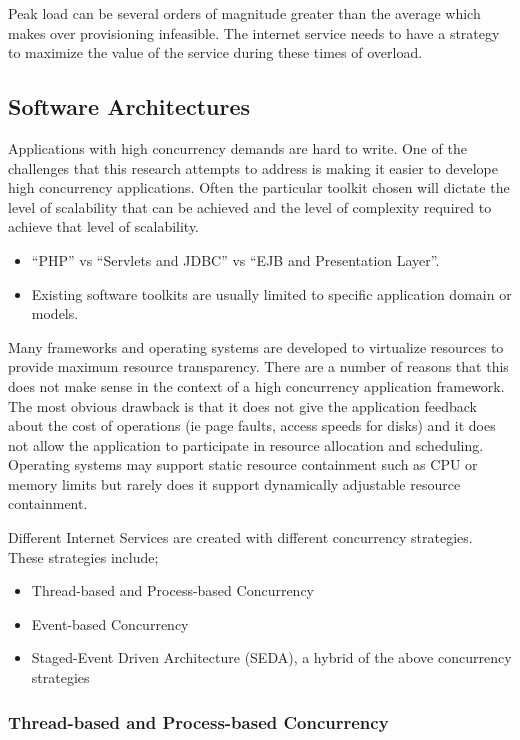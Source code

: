 \documentclass[a4paper]{article}
\begin{document}
Peak load can be several orders of magnitude greater than the average which makes over provisioning infeasible. The internet service needs to have a strategy to maximize the value of the service during these times of overload.

\subsection{Software Architectures}

Applications with high concurrency demands are hard to write. One of the challenges that this research attempts to address is making it easier to develope high concurrency applications. Often the particular toolkit chosen will dictate the level of scalability that can be achieved and the level of complexity required to achieve that level of scalability. 

\begin{itemize}
\item ``PHP'' vs ``Servlets and JDBC'' vs ``EJB and Presentation Layer''.
\item Existing software toolkits are usually limited to specific application domain or models.
\end{itemize}

Many frameworks and operating systems are developed to virtualize resources to provide maximum resource transparency. There are a number of reasons that this does not make sense in the context of a high concurrency application framework. The most obvious drawback is that it does not give the application feedback about the cost of operations (ie page faults, access speeds for disks) and it does not allow the application to participate in resource allocation and scheduling. Operating systems may support static resource containment such as CPU or memory limits but rarely does it support dynamically adjustable resource containment.

Different Internet Services are created with different concurrency strategies. These strategies include;

\begin{itemize}
\item Thread-based and Process-based Concurrency
\item Event-based Concurrency
\item Staged-Event Driven Architecture (SEDA), a hybrid of the above concurrency strategies
\end{itemize}

\subsubsection{Thread-based and Process-based Concurrency}
\end{document}
